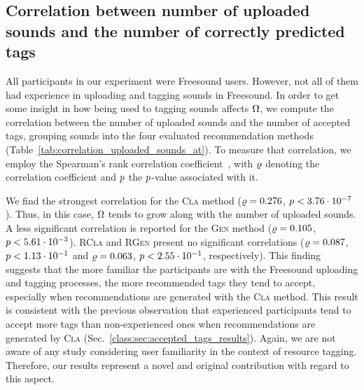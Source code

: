 \subsection{Correlation between number of uploaded sounds and the number of correctly predicted tags}
\label{class:sec:n_uploaded_sounds_at_correlation}

All participants in our experiment were Freesound users. However, not all of them had experience in uploading and tagging sounds in Freesound. In order to get some insight in how being used to tagging sounds affects $\Omega$, we compute the correlation between the number of uploaded sounds and the number of accepted tags, grouping sounds into the four evaluated recommendation methods (Table~\ref{tab:correlation_uploaded_sounds_at}). To measure that correlation, we employ the Spearman's rank correlation coefficient~\citep{Corder2009}, with $\varrho$ denoting the correlation coefficient and $p$ the $p$-value associated with it.

We find the strongest correlation for the \textsc{Cla} method ($\varrho=0.276$, $p<3.76\cdot 10^{-7}$). Thus, in this case, $\Omega$ tends to grow along with the number of uploaded sounds. A less significant correlation is reported for the \textsc{Gen} method ($\varrho=0.105$, $p<5.61\cdot 10^{-3}$). \textsc{RCla} and \textsc{RGen} present no significant correlations ($\varrho=0.087$, $p<1.13\cdot 10^{-1}$ and $\varrho=0.063$, $p<2.55\cdot 10^{-1}$, respectively). This finding suggests that the more familiar the participants are with the Freesound uploading and tagging processes, the more recommended tags they tend to accept, especially when recommendations are generated with the \textsc{Cla} method. This result is consistent with the previous observation that experienced participants tend to accept more tags than non-experienced ones when recommendations are generated by \textsc{Cla} (Sec.~\ref{class:sec:accepted_tags_results}). Again, we are not aware of any study considering user familiarity in the context of resource tagging. Therefore, our results represent a novel and original contribution with regard to this aspect.

